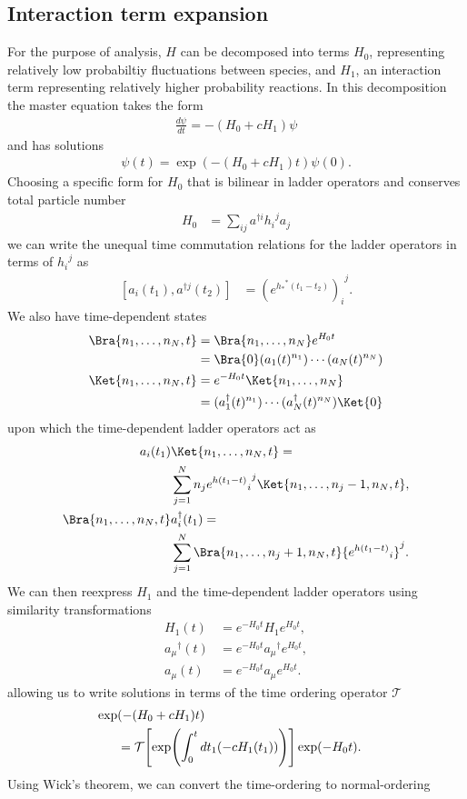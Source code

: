 \subsection{Interaction term expansion}
For the purpose of analysis, $H$ can be decomposed into terms $H_0$, representing relatively low probabiltiy fluctuations between species, and $H_1$, an interaction term representing relatively higher probability reactions. In this decomposition the master equation takes the form
\begin{align*}
\frac{d \psi}{dt} = -(H_0+cH_1)\psi
\end{align*}
and has solutions
\begin{align*}
\psi(t) = \exp(-(H_0+cH_1)t)\psi(0).
\end{align*}
Choosing a specific form for $H_0$ that is bilinear in ladder operators and conserves total particle number
\begin{align*}
H_0 &= \sum_{ij} a^{\dagger i} {h_{i}}^{j} a_{j}
\end{align*}
we can write the unequal time commutation relations for the ladder operators in terms of ${h_{i}}^{j}$ as
\begin{align*}
\left[ a_{i}(t_1),a^{\dagger j}(t_2) \right] &= {\left(e^{{h_{*}}^{*} (t_1 - t_2)}\right)_{i}}^{j}.
\end{align*}
We also have time-dependent states
\begin{align*}
\Bra{n_1,\ldots,n_N,t} &= \Bra{n_1,\ldots,n_N} e^{H_0 t} \cr
&= \Bra{0} (a_1 (t)^{n_1}) \cdots (a_N (t)^{n_N})\\
\Ket{n_1,\ldots,n_N,t} &= e^{-H_0 t} \Ket{n_1,\ldots,n_N} \cr
&= (a^{\dagger}_1 (t)^{n_1}) \cdots (a^{\dagger}_N (t)^{n_N})\Ket{0}
\end{align*}
upon which the time-dependent ladder operators act as
\begin{align*}
a_i(t_1) &\Ket{n_1,\ldots,n_N,t} = \cr
&\sum_{j=1}^N n_j {{e^{h(t_1-t)}}_{i}}^{j} \Ket{n_1,\ldots,n_j-1,n_N,t},\\
\Bra{n_1,\ldots,n_N,t}& a^{\dagger}_i(t_1)  = \cr
&\sum_{j=1}^N \Bra{n_1,\ldots,n_j+1,n_N,t} {{e^{h(t_1-t)}}_{i}}^{j}.
\end{align*}
We can then reexpress $H_1$ and the time-dependent ladder operators using similarity transformations
\begin{align*}
H_1(t) &= e^{-H_0 t} H_1 e^{H_0 t},\\
{a_{\mu}}^{\dagger}(t) &= e^{-H_0 t} {a_{\mu}}^{\dagger} e^{H_0 t},\\
{a_{\mu}}(t) &= e^{-H_0 t} {a_{\mu}} e^{H_0 t}.
\end{align*}
allowing us to write solutions in terms of the time ordering operator $\mathcal{T}$
\begin{align*}
\exp &(-(H_0 + cH_1)t) \cr
&= \mathcal{T} \Biggl[ \exp \Biggl(\int_0^t dt_1 (-c H_1(t_1))\Biggr) \Biggr] \exp(-H_0 t).
\end{align*}
Using Wick's theorem, we can convert the time-ordering to normal-ordering

